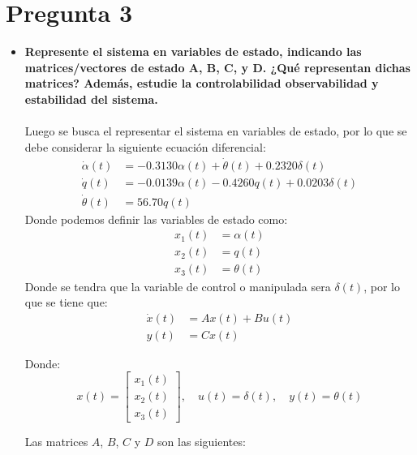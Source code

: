 \section{Pregunta 3}
\begin{itemize}
	\item \textbf{Represente el sistema en variables de estado, indicando las matrices/vectores de estado A, B, C, y D. ¿Qué representan dichas matrices? Además, estudie la controlabilidad observabilidad y estabilidad del sistema.}\\\\
	Luego se busca el representar el sistema en variables de estado, por lo que se debe considerar la siguiente ecuación diferencial:
	\begin{align}
		\dot{\alpha}(t) &= -0.3130\alpha(t) + \dot{\theta}(t) + 0.2320\delta(t) \\
		\dot{q}(t) &= -0.0139\alpha(t) - 0.4260q(t) + 0.0203\delta(t) \\
		\dot{\theta}(t) &= 56.70q(t)
	\end{align}
	Donde podemos definir las variables de estado como:
	\begin{align}
		x_1(t) &= \alpha(t) \\
		x_2(t) &= q(t) \\
		x_3(t) &= \theta(t)
	\end{align}
	Donde se tendra que la variable de control o manipulada sera $\delta(t)$, por lo que se tiene que:
	\begin{align}
		\dot{x}(t) &= A x(t) + B u(t) \\
		y(t) &= C x(t) 
		\end{align}
		
		Donde:
		\[
		x(t) = \begin{bmatrix}
			x_1(t) \\
			x_2(t) \\
			x_3(t)
		\end{bmatrix}, \quad u(t) = \delta(t), \quad y(t) = \theta(t)
		\]
		
		Las matrices $A$, $B$, $C$ y $D$ son las siguientes:
		

\end{itemize}
